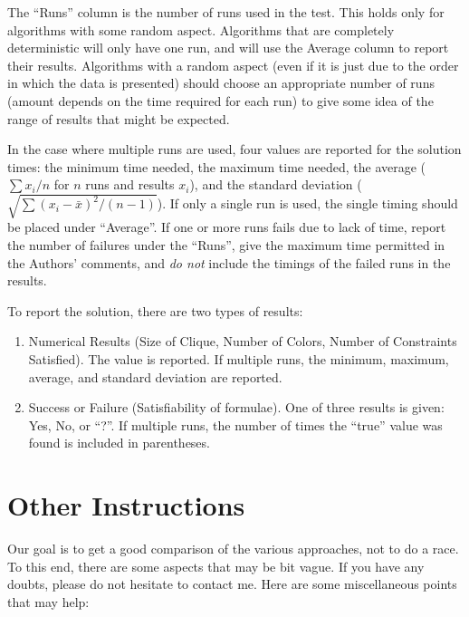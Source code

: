 The ``Runs'' column is the number of runs used in the test.  This
holds only for algorithms with some random aspect.  Algorithms that
are completely deterministic will only have one run, and will use the
Average column to report their results.  Algorithms with a random
aspect (even if it is just due to the order in which the data is
presented) should choose an appropriate number of runs (amount depends
on the time required for each run) to give some idea of the range of
results that might be expected.

In the case where multiple runs are used, four values are reported for
the solution times: the minimum time needed, the maximum time needed,
the average ($\sum x_i/n$ for $n$ runs and results $x_i$), and the
standard deviation ($\sqrt{\sum(x_i-\bar{x})^2/(n-1)}$).  If only a
single run is used, the single timing should be placed under
``Average''.  If one or more runs fails due to lack of time, report
the number of failures under the ``Runs'', give the maximum time
permitted in the Authors' comments, and {\it do not} include the
timings of the failed runs in the results.

To report the solution, there are two types of results:

\begin{enumerate}
\item Numerical Results (Size of Clique, Number of Colors, Number of
  Constraints Satisfied).  The value is reported.  If multiple runs,
  the minimum, maximum, average, and standard deviation are reported.

\item Success or Failure (Satisfiability of formulae).  One of three
  results is given:  Yes, No, or ``?''.  If multiple runs, the number
  of times the ``true'' value was found is included in parentheses.
\end{enumerate}

\section{Other Instructions}

Our goal is to get a good comparison of the various approaches, not to
do a race.  To this end, there are some aspects that may be bit vague.
If you have any doubts, please do not hesitate to contact me.  Here
are some miscellaneous points that may help:

